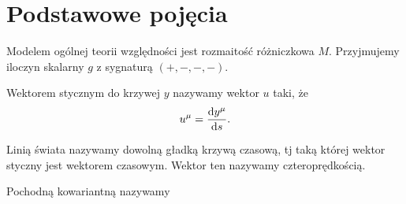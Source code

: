 \section{Podstawowe pojęcia}
Modelem ogólnej teorii względności jest rozmaitość różniczkowa $M$. 
Przyjmujemy iloczyn skalarny $g$ z sygnaturą $(+,-,-,-)$.
\begin{definition}
Wektorem stycznym do krzywej $y$ nazywamy wektor $u$ taki, że
\begin{align*}
u^\mu = \frac{\text{d} y^\mu}{\text{d} s}.
\end{align*}
\end{definition}
\begin{definition}
Linią świata nazywamy dowolną gładką krzywą czasową, tj taką której wektor 
styczny jest wektorem czasowym. Wektor ten nazywamy czteroprędkością.
\end{definition}
\begin{definition}
Pochodną kowariantną nazywamy
\end{definition}
